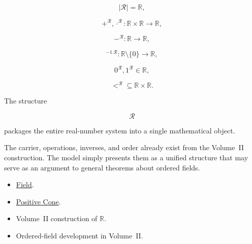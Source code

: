 
\begin{remark*}

\[
|\mathcal R|
=
\mathbb R,
\]

\[
+^{\mathcal R},
\cdot^{\mathcal R}
:
\mathbb R\times\mathbb R
\to
\mathbb R,
\]

\[
-^{\mathcal R}
:
\mathbb R
\to
\mathbb R,
\]

\[
{}^{-1\,\mathcal R}
:
\mathbb R\setminus\{0\}
\to
\mathbb R,
\]

\[
0^{\mathcal R},
1^{\mathcal R}
\in
\mathbb R,
\]

\[
<^{\mathcal R}
\subseteq
\mathbb R\times\mathbb R.
\]

\end{remark*}


\begin{remark*}[Interpretation]

The structure

\[
\mathcal R
\]

packages the entire real-number system into a single mathematical object.

The carrier, operations, inverses, and order already exist from the Volume~II
construction. The model simply presents them as a unified structure that may
serve as an argument to general theorems about ordered fields.

\end{remark*}


\begin{remark*}[Dependencies]

\begin{itemize}
    \item \hyperref[def:field]{Field}.
    \item \hyperref[def:positive-cone]{Positive Cone}.
    \item Volume~II construction of $\mathbb R$.
    \item Ordered-field development in Volume~II.
\end{itemize}

\end{remark*}

